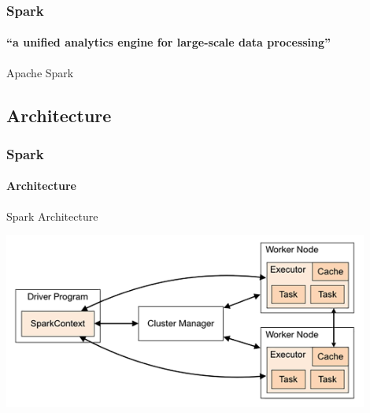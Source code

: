 \documentclass[aspectratio=169,usenames,dvipsnames]{beamer}
\begin{document}
    \begin{frame}
        \frametitle{Spark}
        \framesubtitle{``a unified analytics engine for large-scale data processing''}
        \begin{block}{Apache Spark}
        \begin{center}
        \end{center}
        \end{block}
    \end{frame}

    \subsection{Architecture}
        \begin{frame}
            \frametitle{Spark}
            \framesubtitle{Architecture}
            \begin{block}{Spark Architecture}
            \begin{center}
                \includegraphics[width=0.9\textwidth]{spark-architecture.png}
            \end{center}
            \end{block}

        \end{frame}
\end{document}

